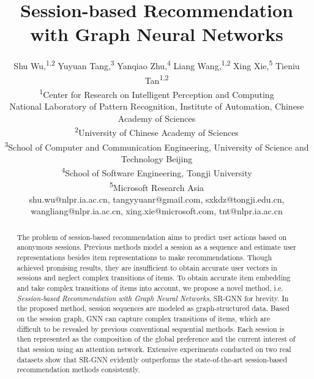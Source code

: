 \documentclass[letterpaper]{article} \usepackage{cite}
\begin{document}
\title{Session-based Recommendation with Graph Neural Networks}

\author{
Shu Wu,\textsuperscript{\rm 1,2}
Yuyuan Tang,\textsuperscript{\rm 3}
Yanqiao Zhu,\textsuperscript{\rm 4}
Liang Wang,\textsuperscript{\rm 1,2}
Xing Xie,\textsuperscript{\rm 5}
Tieniu Tan\textsuperscript{\rm 1,2}\\
\textsuperscript{\rm 1}{Center for Research on Intelligent Perception and Computing}\\{National Laboratory of Pattern Recognition, Institute of Automation, Chinese Academy of Sciences}\\
\textsuperscript{\rm 2}{University of Chinese Academy of Sciences}\\
\textsuperscript{\rm 3}{School of Computer and Communication Engineering, University of Science and Technology Beijing}\\
\textsuperscript{\rm 4}{School of Software Engineering, Tongji University}\\
\textsuperscript{\rm 5}{Microsoft Research Asia}\\
shu.wu@nlpr.ia.ac.cn, tangyyuanr@gmail.com, sxkdz@tongji.edu.cn,\\
wangliang@nlpr.ia.ac.cn, xing.xie@microsoft.com, tnt@nlpr.ia.ac.cn
}

\maketitle

\begin{abstract}

The problem of session-based recommendation aims to predict user actions based on anonymous sessions. Previous methods model a session as a sequence and estimate user representations besides item representations to make recommendations. Though achieved promising results, they are insufficient to obtain accurate user vectors in sessions and neglect complex transitions of items. To obtain accurate item embedding and take complex transitions of items into account, we propose a novel method, i.e. {\it Session-based Recommendation with Graph Neural Networks}, SR-GNN for brevity. In the proposed method, session sequences are modeled as graph-structured data. Based on the session graph, GNN can capture complex transitions of items, which are difficult to be revealed by previous conventional sequential methods. Each session is then represented as the composition of the global preference and the current interest of that session using an attention network. Extensive experiments conducted on two real datasets show that SR-GNN evidently outperforms the state-of-the-art session-based recommendation methods consistently.

\end{abstract}
\end{document}
